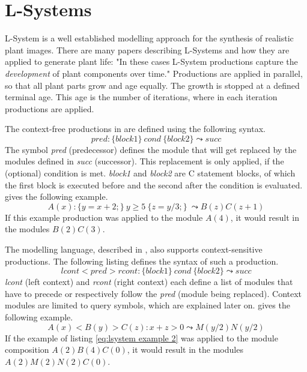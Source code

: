 \pagebreak
\section{L-Systems} \label{sec:L-Systems}
L-System is a well established modelling approach for the synthesis of realistic plant images. There are many papers describing L-Systems and how they are applied to generate plant life: "In these cases L-System productions capture the \textit{development} of plant components over time." \citep{PrusinkiewiczEtAl:2001} Productions are applied in parallel, so that all plant parts grow and age equally. The growth is stopped at a defined terminal age. This age is the number of iterations, where in each iteration productions are applied.

The context-free productions in \citep{PrusinkiewiczEtAl:2001} are defined using the following syntax.
\begin{equation} \label{eq:lsystem context free}
pred : \{block1\}\ cond\ \{block2\} \leadsto succ
\end{equation}
The symbol \textit{pred} (predecessor) defines the module that will get replaced by the modules defined in \textit{succ} (successor). This replacement is only applied, if the (optional) condition is met. \textit{block1} and \textit{block2} are C statement blocks, of which the first block is executed before and the second after the condition is evaluated. \citep{PrusinkiewiczEtAl:2001} gives the following example.
\begin{equation} \label{eq:lsystem example 1}
A(x) : \{y = x + 2;\}\ y \geq 5\ \{z = y / 3;\}\ \leadsto B(z)C(z + 1)
\end{equation}
If this example production was applied to the module $A(4)$, it would result in the modules $B(2)C(3)$.

The modelling language, described in \citep{PrusinkiewiczEtAl:2001}, also supports context-sensitive productions. The following listing defines the syntax of such a production.
\begin{equation} \label{eq:lsystem context sensitive}
lcont < pred > rcont : \{block1\}\ cond\ \{block2\} \leadsto succ
\end{equation}
\textit{lcont} (left context) and \textit{rcont} (right context) each define a list of modules that have to precede or respectively follow the \textit{pred} (module being replaced). Context modules are limited to query symbols, which are explained later on. \citep{PrusinkiewiczEtAl:2001} gives the following example.
\begin{equation} \label{eq:lsystem example 2}
A(x) < B(y) > C(z) : x + z > 0 \leadsto M(y / 2)N(y / 2)
\end{equation}
If the example of listing \ref{eq:lsystem example 2} was applied to the module composition $A(2)B(4)C(0)$, it would result in the modules $A(2)M(2)N(2)C(0)$.

